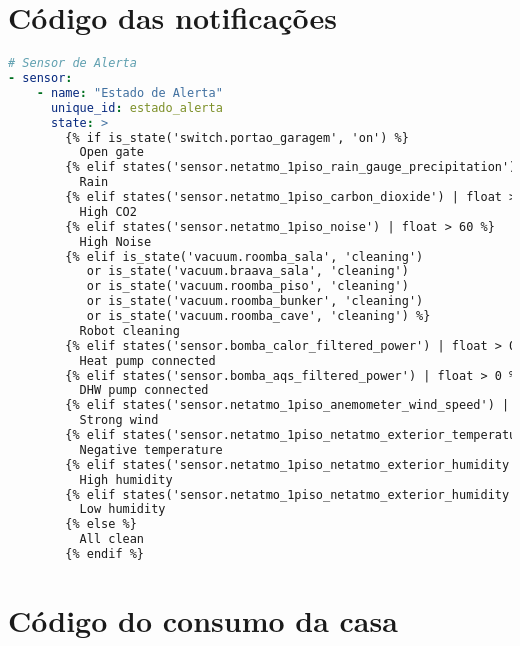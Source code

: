 \section{Código das notificações}

\lstset{inputencoding=ascii}
\begin{lstlisting}[language=YAML, caption={notifications.yaml}]
# Sensor de Alerta
- sensor:
    - name: "Estado de Alerta"
      unique_id: estado_alerta
      state: >
        {% if is_state('switch.portao_garagem', 'on') %}
          Open gate
        {% elif states('sensor.netatmo_1piso_rain_gauge_precipitation') | float > 0.1 %}
          Rain
        {% elif states('sensor.netatmo_1piso_carbon_dioxide') | float > 1000 %}
          High CO2
        {% elif states('sensor.netatmo_1piso_noise') | float > 60 %}
          High Noise
        {% elif is_state('vacuum.roomba_sala', 'cleaning')
           or is_state('vacuum.braava_sala', 'cleaning')
           or is_state('vacuum.roomba_piso', 'cleaning')
           or is_state('vacuum.roomba_bunker', 'cleaning')
           or is_state('vacuum.roomba_cave', 'cleaning') %}
          Robot cleaning
        {% elif states('sensor.bomba_calor_filtered_power') | float > 0 %}
          Heat pump connected
        {% elif states('sensor.bomba_aqs_filtered_power') | float > 0 %}
          DHW pump connected
        {% elif states('sensor.netatmo_1piso_anemometer_wind_speed') | float > 40 %}
          Strong wind
        {% elif states('sensor.netatmo_1piso_netatmo_exterior_temperature') | float < 0 %}
          Negative temperature
        {% elif states('sensor.netatmo_1piso_netatmo_exterior_humidity') | float > 85 %}
          High humidity
        {% elif states('sensor.netatmo_1piso_netatmo_exterior_humidity') | float < 30 %}
          Low humidity
        {% else %}
          All clean
        {% endif %}


\end{lstlisting}


\section{Código do consumo da casa}

